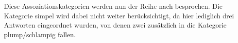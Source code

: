 Diese Assoziationskategorien werden nun der Reihe nach besprochen.
Die Kategorie \glqq simpel\grqq{} wird dabei nicht weiter berücksichtigt, da hier lediglich drei Antworten eingeordnet wurden, von denen zwei zusätzlich in die Kategorie \glqq plump/schlampig\grqq{} fallen. 
